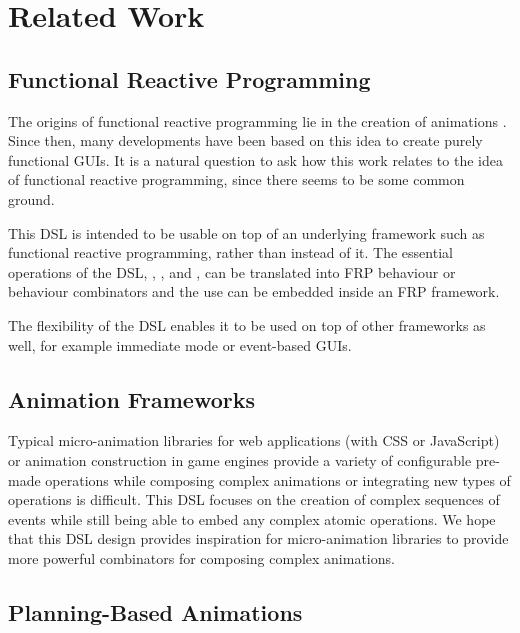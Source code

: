 \section{Related Work}
\label{sec:related}

\subsection{Functional Reactive Programming}
The origins of functional reactive programming lie in the creation of animations \cite{DBLP:conf/icfp/ElliottH97}. Since then, many developments have been based on this idea to create purely functional GUIs. It is a natural question to ask how this work relates to the idea of functional reactive programming, since there seems to be some common ground.

This DSL is intended to be usable on top of an underlying framework such as functional reactive programming, rather than instead of it. The essential operations of the DSL, , , and , can be translated into FRP behaviour or behaviour combinators and the use can be embedded inside an FRP framework.

The flexibility of the DSL enables it to be used on top of other frameworks as well, for example immediate mode or event-based GUIs.

\subsection{Animation Frameworks}

Typical micro-animation libraries for web applications (with CSS or JavaScript) or animation construction in game engines provide a variety of configurable pre-made operations while composing complex animations or integrating new types of operations is difficult. This DSL focuses on the creation of complex sequences of events while still being able to embed any complex atomic operations. We hope that this DSL design provides inspiration for micro-animation libraries to provide more powerful combinators for composing complex animations.




\subsection{Planning-Based Animations}

